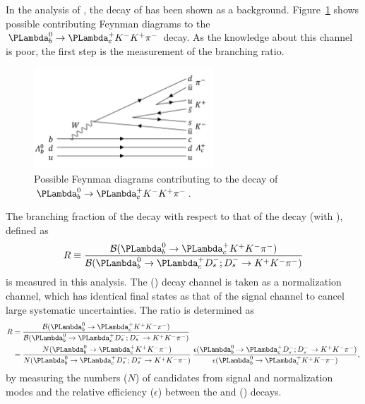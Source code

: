 In the analysis of \LbLcpppi, 
the decay of \LbLckkpi has been shown as a background.
Figure~\ref{fig:feynman} shows possible contributing Feynman diagrams to the $\Lb \to \Lc \Km \Kp \pi^-$ decay.
As the knowledge about this channel is poor, the first step is  the measurement of the branching ratio.

\begin{figure}[thb]
\centering
\includegraphics[width=0.6\textwidth]{Figures/05_open_charm/01_introduction/Fig1.pdf}
\caption{Possible Feynman diagrams contributing to the decay of $\Lb\to\Lc\Km\Kp\pi^-$.}
\label{fig:feynman}
\end{figure}

The branching fraction of the \LbLckkpi decay with respect to that of the \LbLcDs decay (with \Dskkpi), defined as
\begin{equation}
R \equiv \frac{\BR( \LbLckkpi)}{\BR( \LbLcDskkpi)}
\end{equation}
is measured in this analysis. 
The \LbLcDs(\Dskkpi) decay channel is taken as a normalization channel, 
which has identical final states as that of the signal channel to cancel large systematic uncertainties. 
The ratio is determined as
\begin{equation}
\label{eq:relativeBR}
\begin{split}
	R &= \frac{\BR( \LbLckkpi)}{\BR( \LbLcDskkpi)} \\
        &=\frac{N(\LbLckkpi)}{N(\LbLcDskkpi)}\,\frac{\epsilon(\LbLcDskkpi)}{\epsilon(\LbLckkpi)},
\end{split}
\end{equation}
by measuring the numbers ($N$) of candidates from signal and normalization modes 
and the relative efficiency ($\epsilon$) between the \LbLckkpi and \LbLcDs(\Dskkpi) decays.










